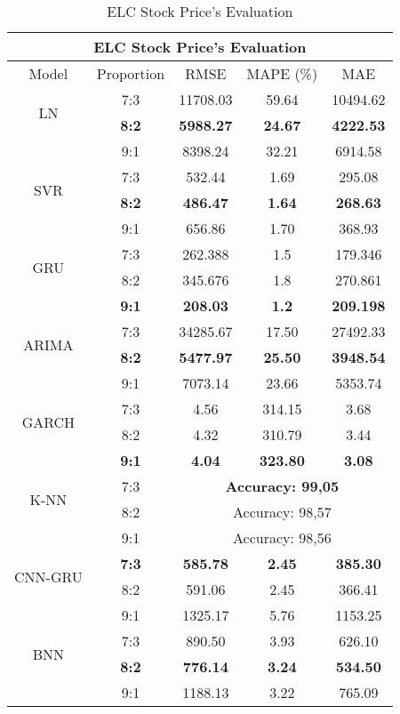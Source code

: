 \documentclass{ieeeojies}
\begin{document}
\begin{table}[H]
    \centering
    \begin{tabular}{|c|c|c|c|c|}
         \hline
         \multicolumn{5}{|c|}{\textbf{ELC Stock Price's Evaluation}}\\
         \hline
         \centering Model & Proportion & RMSE & MAPE (\%) & MAE\\
         \hline
         \multirow{2}{*}{LN} & 7:3 &11708.03 &59.64 & 10494.62 \\ & \textbf{8:2}  & \textbf{5988.27} & \textbf{24.67} & \textbf{4222.53} \\ & 9:1 & 8398.24&32.21 &6914.58 \\
         \hline
         \multirow{2}{*}{SVR} & 7:3 & 532.44 &1.69 &295.08\\ & \textbf{8:2} &\textbf{486.47} &\textbf{1.64} &\textbf{268.63} \\ & 9:1 & 656.86 &1.70  & 368.93\\
         \hline
         \multirow{2}{*}{GRU} &7:3 	&262.388 &1.5  &179.346  \\ & 8:2 &345.676  &1.8  & 270.861 \\ & \textbf{9:1} & \textbf{208.03}  & \textbf{1.2} &\textbf{209.198}\\
         \hline
         \multirow{2}{*}{ARIMA} & 7:3 & 34285.67  &17.50 &27492.33  \\ & \textbf{8:2} & \textbf{5477.97} & \textbf{25.50} & \textbf{3948.54} \\ & 9:1 &7073.14   & 23.66 &5353.74 \\
         \hline
         \multirow{2}{*}{GARCH} & 7:3	&4.56 &314.15 &3.68  \\ & 8:2 &4.32  & 310.79 &3.44  \\ & \textbf{9:1} &\textbf{4.04}  &\textbf{323.80} & \textbf{3.08}\\
         \hline
         \multirow{2}{*}{K-NN} & 7:3 & \multicolumn{3}{c|}{\textbf{Accuracy: 99,05}}  \\ & 8:2 & \multicolumn{3}{c|}{Accuracy: 98,57}   \\ & 9:1 & \multicolumn{3}{c|}{Accuracy: 98,56}   \\
         \hline
         \multirow{2}{*}{CNN-GRU} & \textbf{7:3} &\textbf{585.78}  &\textbf{2.45}  & \textbf{385.30} \\ & 8:2 & 591.06 &2.45 &  366.41\\ & 9:1 &1325.17  	 & 5.76& 1153.25	 \\
         \hline
         \multirow{2}{*}{BNN} & 7:3 &890.50   & 3.93 &626.10 \\ & \textbf{8:2} & \textbf{776.14} &\textbf{3.24} & \textbf{534.50}\\ & 9:1& 1188.13 & 3.22  &765.09 \\
         \hline
    \end{tabular}
    \caption{ELC Stock Price's Evaluation}
    \label{ELCresult}
\end{table}
\end{document}
